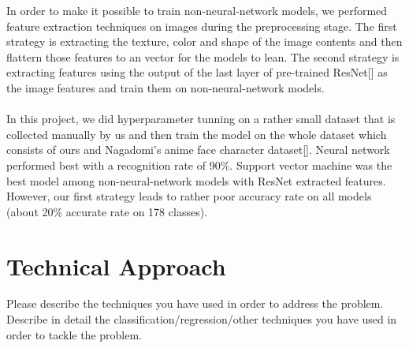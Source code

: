 \documentclass[11.5pt]{article}
\begin{document}
In order to make it possible to train non-neural-network models, we performed feature extraction techniques on images during the preprocessing stage. The first strategy is extracting the texture, color and shape of the image contents and then flattern those features to an vector for the models to lean. The second strategy is extracting features using the output of the last layer of pre-trained ResNet[] as the image features and train them on non-neural-network models.\\ \\
In this project, we did hyperparameter tunning on a rather small dataset that is collected manually by us and then train the model on the whole dataset which consists of ours and Nagadomi’s anime face character dataset[]. Neural network performed best with a recognition rate of 90\%. Support vector machine was the best model among non-neural-network models with ResNet extracted features. However, our first strategy leads to rather poor accuracy rate on all models (about 20\% accurate rate on 178 classes). 


\section{Technical Approach}
Please describe the techniques you have used in order to address the problem.
Describe in detail the classification/regression/other techniques you have used in order to tackle the problem.
\end{document}
